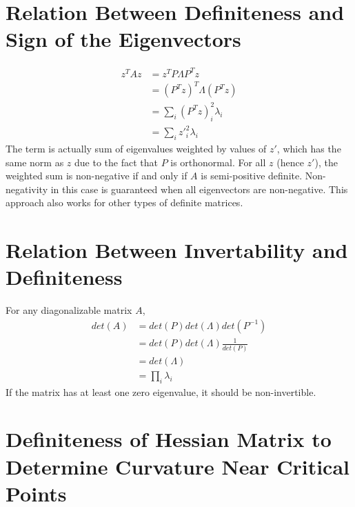 \documentclass{book}
\numberwithin{equation}{subsection}
\begin{document}
\section{Relation Between Definiteness and Sign of the Eigenvectors}
\begin{align}
    z^TAz &= z^TP\Lambda P^Tz\\
    &= (P^Tz)^T\Lambda (P^Tz)\\
    &= \sum_i (P^Tz)_i^2 \lambda_i\\
    &= \sum_i z'_i^2 \lambda_i
\end{align}
The term is actually sum of eigenvalues weighted by values of $z'$, which has the same norm as $z$ due to the fact that $P$ is orthonormal. For all $z$ (hence $z'$), the weighted sum is non-negative if and only if $A$ is semi-positive definite. Non-negativity in this case is guaranteed when all eigenvectors are non-negative. This approach also works for other types of definite matrices.
\section{Relation Between Invertability and Definiteness}
For any diagonalizable matrix $A$,
\begin{align}
    det(A) &= det(P) det(\Lambda) det(P^{-1})\\
    &= det(P) det(\Lambda) \frac{1}{det(P)}\\
    &= det(\Lambda)\\
    &= \prod_i \lambda_i
\end{align}
If the matrix has at least one zero eigenvalue, it should be non-invertible.
\section{Definiteness of Hessian Matrix to Determine Curvature Near Critical Points}
\end{document}
